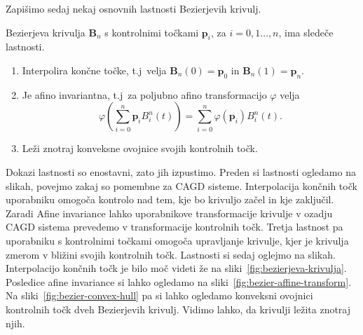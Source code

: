 \documentclass[isrm2, tisk]{fmfdelo}
\newcommand{\p}{\mathbf{p}}
\newcommand{\lilb}[2]{B_{#1}^{#2}(t)}
\newcommand{\bigbbod}[2]{\textbf{B}_{#1}(#2)}
\newcommand{\bernsteinsump}[2]{\sum_{#1=0}^{#2} \p_{#1}\lilb{#1}{#2}}
\newcommand{\bernsteinsumtritri}[3]{\sum_{#1=0}^{#2} #3\lilb{#1}{#2}}
\begin{document}
    Zapišimo sedaj nekaj osnovnih lastnosti Bezierjevih krivulj.
    \begin{izrek}{Bezierjeva krivulja $\mathbf{B}_n$ s kontrolnimi točkami $\p_i$, za $i=0,1\ldots,n$, ima sledeče lastnosti.}
        \label{izrek:lastnosti-bezierjevih-krivulj}
        \begin{enumerate}
            \item Interpolira končne točke, t.j\ velja $\bigbbod{n}{0}=\p_0$ in $\bigbbod{n}{1}=\p_n$.
            \item Je afino invariantna, t.j\ za poljubno afino transformacijo $\varphi$ velja \[\varphi \left(\bernsteinsump{i}{n}\right) =\bernsteinsumtritri{i}{n}{\varphi(\p_i)}.\]
            \item Leži znotraj konveksne ovojnice svojih kontrolnih točk.
        \end{enumerate}
    \end{izrek}
    Dokazi lastnosti so enostavni, zato jih izpustimo.
    Preden si lastnosti ogledamo na slikah, povejmo zakaj so pomembne za CAGD sisteme.
    Interpolacija končnih točk uporabniku omogoča kontrolo nad tem, kje bo krivuljo začel in kje zaključil.
    Zaradi Afine invariance lahko uporabnikove transformacije krivulje v ozadju CAGD sistema prevedemo v transformacije kontrolnih točk.
    Tretja lastnost pa uporabniku s kontrolnimi točkami omogoča upravljanje krivulje, kjer je krivulja zmerom v bližini svojih kontrolnih točk.
    Lastnosti si sedaj oglejmo na slikah.
    Interpolacijo končnih točk je bilo moč videti že na sliki~\ref{fig:bezierjeva-krivulja}.
    Posledice afine invariance si lahko ogledamo na sliki~\ref{fig:bezier-affine-transform}.
    Na sliki~\ref{fig:bezier-convex-hull} pa si lahko ogledamo konveksni ovojnici kontrolnih točk dveh Bezierjevih krivulj.
    Vidimo lahko, da krivulji ležita znotraj njih.
\end{document}
